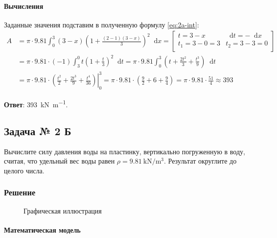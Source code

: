 \documentclass[a4paper,12pt]{article}
\newcommand*\diff{\mathop{}\!\mathrm{d}}
\begin{document}
\paragraph{Вычисления}

Заданные значения подставим в полученную формулу \ref{eq:2a-int}:
\begin{equation*}
\begin{split}
  A &= \pi \cdot 9.81 \int_{0}^{3} (3 - x)
      {\left(1 + \frac{(2 - 1)(3 - x)}{3} \right)}^2 \diff x
    =
      \begin{bmatrix}
        t = 3 - x        & \diff t = - \diff x \\
        t_1 = 3 - 0  = 3 & t_2 = 3 - 3 = 0 \\
      \end{bmatrix} \\
    &= \pi \cdot 9.81 \cdot (-1)
       \int_{3}^{0} t {\left(1 + \frac{t}{3}\right)}^2 \diff t
     = \pi \cdot 9.81
       \int_{0}^{3}
         \left(t + \frac{2 t^2}{3} + \frac{t^3}{9} \right) \diff t \\
    &= \pi \cdot 9.81 \cdot
       \left.
         \left(\frac{t^2}{2} + \frac{2 t^3}{9} + \frac{t^4}{36} \right)
       \right\rvert_{0}^{3}
     = \pi \cdot 9.81 \cdot
     \left(\frac{9}{2} + 6 + \frac{9}{4} \right)
     = \pi \cdot 9.81 \cdot \frac{51}{4}
     \approx 393
\end{split}
\end{equation*}

\textbf{Ответ}: \SI{393}{\kilo\newton\per\metre}.

\subsection{Задача № 2 Б}

Вычислите силу давления воды на пластинку, вертикально погруженную в воду,
считая, что удельный вес воды равен \(\rho = \SI{9.81}{\kN\per\cubic\metre}\).
Результат округлите до целого числа.

\subsubsection{Решение}

\begin{figure}[htbp]
  \centering
  \caption{Графическая иллюстрация}\label{fig:2b}
\end{figure}

\paragraph{Математическая модель}
\end{document}
